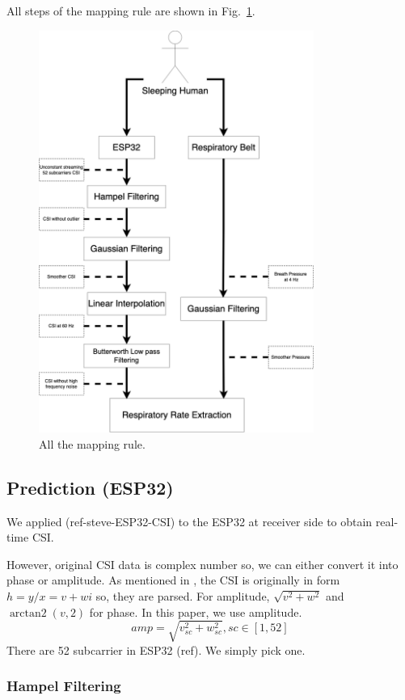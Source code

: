\documentclass[10pt,letterpaper]{article}
\DeclareMathOperator{\arctantwo}{arctan2}
\begin{document}
	All steps of the mapping rule are shown in Fig.~\ref{fig:MAPINGSTEP}. 
	

	\begin{figure}[htbp]
		\centerline{\includegraphics[width=90mm,scale=0.2]{STEP09.png}}
		\caption{All the mapping rule.}
		\label{fig:MAPINGSTEP}
	\end{figure}
	
	\subsection*{Prediction (ESP32)}
	
	We applied (ref-steve-ESP32-CSI) to the ESP32 at receiver side to obtain real-time CSI. 
	
	However, original CSI data is complex number so, we can either convert it into phase or amplitude. As mentioned in , the CSI is originally in form $h=y/x=v+wi$ so, they are parsed. For amplitude,  $\sqrt{ v^2+w^2 }$ and $\arctantwo(v, 2 )$ for phase.
	In this paper, we use amplitude.
	\begin{equation}
	amp =  {  \sqrt{ v_{sc}^2+w_{sc}^2 } , sc \in [1, 52]}
	\label{eq:CSIampParser}
\end{equation}	
	There are 52 subcarrier in ESP32 (ref). We simply pick one.
	
	\subsubsection*{Hampel Filtering}
	
\end{document}
